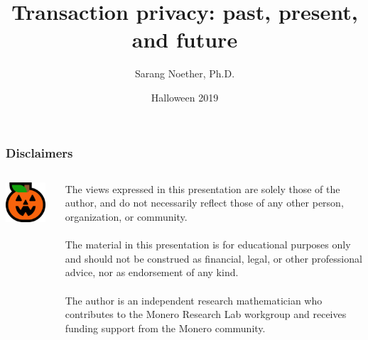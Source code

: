 \documentclass[aspectratio=169]{beamer}
\title[Transaction privacy: past, present, and future]{Transaction privacy: past, present, and future}
\author{Sarang Noether, Ph.D.}
\date{Halloween 2019}
\institute{World Crypto Con, Las Vegas}
\begin{document}
\begin{frame}[plain]
\maketitle
\end{frame}


\begin{frame}
\frametitle{Disclaimers}
\begin{columns}
\begin{column}{0.2\textwidth}
\includegraphics[width=0.9\textwidth]{icon-jack.png}
\end{column}
\begin{column}{0.8\textwidth}
The views expressed in this presentation are solely those of the author, and do not necessarily reflect those of any other person, organization, or community. \\~\\

The material in this presentation is for educational purposes only and should not be construed as financial, legal, or other professional advice, nor as endorsement of any kind. \\~\\

The author is an independent research mathematician who contributes to the Monero Research Lab workgroup and receives funding support from the Monero community.
\end{column}
\end{columns}
\end{frame}
\end{document}
